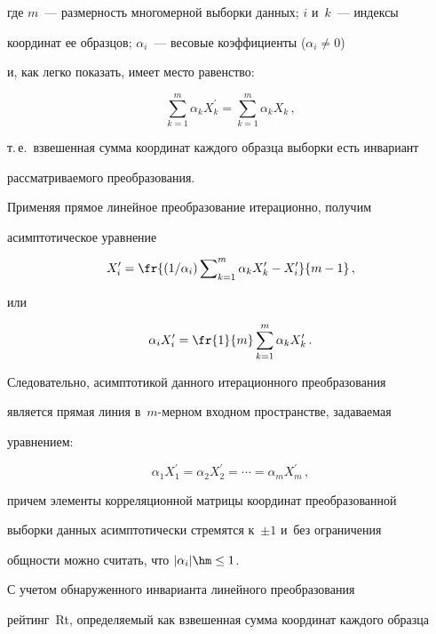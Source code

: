 где $m$~--- размерность многомерной выборки данных; $i$ и~$k$~--- индексы 


координат ее образцов; $\alpha_i$~--- весовые коэффициенты ($\alpha_i\not= 0$) 


и, как легко показать, имеет место равенство:


$$


\sum\limits_{k=1}^m \alpha_k X^\prime_k=\sum\limits_{k=1}^m \alpha_k X_k\,,


$$


т.\,е.\ взвешенная сумма координат каждого образца выборки есть инвариант 


рассматриваемого преобразования.





  Применяя прямое линейное преобразование итерационно, получим 


асимптотическое уравнение


  $$


  X_i^\prime = \fr{(1/\alpha_i) \sum\nolimits_{k=1}^m \alpha_k X_k^\prime -


X_i^\prime}{m-1}\,,


  $$


или


$$


\alpha_i X_i^\prime = \fr{1}{m}\sum\limits_{k=1}^m \alpha_k X^\prime_k\,.


$$


  


  Следовательно, асимптотикой данного итерационного преобразования 


является прямая линия в~$m$-мер\-ном входном пространстве, задаваемая 


уравнением:


  $$


  \alpha_1 X_1^\prime = \alpha_2 X_2^\prime = \cdots = \alpha_m X_m^\prime\,,


  $$


причем элементы корреляционной матрицы координат преобразованной 


выборки данных асимптотически стремятся к~$\pm1$ и~без ограничения 


общности можно считать, что $\vert\alpha_i\vert\hm\leq 1$.





  С учетом обнаруженного инварианта линейного преобразования 


рейтинг~Rt, определяемый как взвешенная сумма координат каждого образца 



